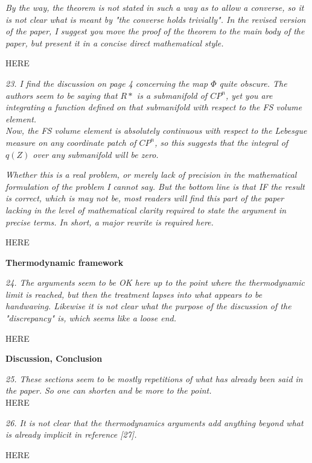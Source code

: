 \documentclass{article}
\newcommand{\REVIEW}[1]{{ \it \textcolor{reviewblack}{#1}}}
\newcommand{\REPLY}[1]{\textcolor{UCDBlue}{#1}}
\begin{document}
\REVIEW{By the way, the theorem is not stated in such a way as to allow a converse, so it is not clear what is meant by "the converse holds trivially". In the revised version of the paper, I suggest you move the proof of the theorem to the main body of the paper, but present it in a concise direct mathematical style.}

\REPLY{HERE}

\REVIEW{23. I find the discussion on page 4 concerning the map $\Phi$ quite obscure. The authors seem to be saying that $R*$ is a submanifold of $CP^n$, yet you are integrating a function defined on that submanifold with respect to the FS volume element.}\\

\REVIEW{Now, the FS volume element is absolutely continuous with respect to the Lebesgue measure on any coordinate patch of $CP^n$, so this suggests that the integral of $q(Z)$ over any submanifold will be zero.}

\REVIEW{Whether this is a real problem, or merely lack of precision in the mathematical formulation of the problem I cannot say. But the bottom line is that IF the result is correct, which is may not be, most readers will find this part of the paper lacking in the level of mathematical clarity required to state the argument in precise terms. In short, a major rewrite is required here.}

\REPLY{HERE}

{\bf Thermodynamic framework}

\REVIEW{24. The arguments seem to be OK here up to the point where the thermodynamic limit is reached, but then the treatment lapses into what appears to be handwaving. Likewise it is not clear what the purpose of the discussion of the "discrepancy" is, which seems like a loose end.}

\REPLY{HERE}

{\bf Discussion, Conclusion}

\REVIEW{25. These sections seem to be mostly repetitions of what has already been said in the paper. So one can shorten and be more to the point.}\\

\REPLY{HERE}

\REVIEW{26. It is not clear that the thermodynamics arguments add anything beyond what is already implicit in reference [27].}

\REPLY{HERE}
\end{document}
